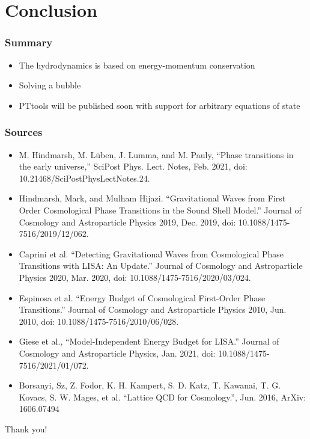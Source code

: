 \section{Conclusion}

\begin{frame}
    \frametitle{Summary}
    \begin{itemize}
        \item The hydrodynamics is based on energy-momentum conservation
        \item Solving a bubble
        \item PTtools will be published soon with support for arbitrary equations of state
    \end{itemize}
\end{frame}

\begin{frame}
    \frametitle{Sources}
    \begin{itemize}
        \scriptsize
        \item M. Hindmarsh, M. Lüben, J. Lumma, and M. Pauly, “Phase transitions in the early universe,” SciPost Phys. Lect. Notes, Feb. 2021, doi: 10.21468/SciPostPhysLectNotes.24.
        \item Hindmarsh, Mark, and Mulham Hijazi. “Gravitational Waves from First Order Cosmological Phase Transitions in the Sound Shell Model.” Journal of Cosmology and Astroparticle Physics 2019, Dec. 2019, doi: 10.1088/1475-7516/2019/12/062.
        \item Caprini et al. “Detecting Gravitational Waves from Cosmological Phase Transitions with LISA: An Update.” Journal of Cosmology and Astroparticle Physics 2020, Mar. 2020, doi: 10.1088/1475-7516/2020/03/024.
        \item Espinosa et al. “Energy Budget of Cosmological First-Order Phase Transitions.” Journal of Cosmology and Astroparticle Physics 2010, Jun. 2010, doi: 10.1088/1475-7516/2010/06/028.
        \item Giese et al., “Model-Independent Energy Budget for LISA.” Journal of Cosmology and Astroparticle Physics, Jan. 2021, doi: 10.1088/1475-7516/2021/01/072.
        \item Borsanyi, Sz, Z. Fodor, K. H. Kampert, S. D. Katz, T. Kawanai, T. G. Kovacs, S. W. Mages, et al. “Lattice QCD for Cosmology.”, Jun. 2016, ArXiv: 1606.07494
    \end{itemize}
\end{frame}

\begin{frame}
    Thank you!
\end{frame}

